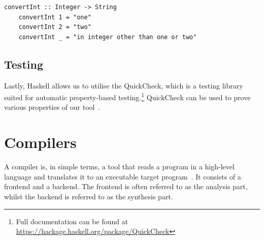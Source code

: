 \begin{lstlisting}[caption={A simple Haskell function converting values of type Integer to its string equivalent}, captionpos=b, frame=tlrb]
    convertInt :: Integer -> String
    convertInt 1 = "one"
    convertInt 2 = "two"
    convertInt _ = "in integer other than one or two"
\end{lstlisting}

\subsection{Testing}

Lastly, Haskell allows us to utilise the QuickCheck, which is a testing library suited for automatic property-based testing.\footnote{Full documentation can be found at \url{https://hackage.haskell.org/package/QuickCheck}} QuickCheck can be used to prove various properties of our tool~\cite{DBLP:conf/icfp/ClaessenH00}.

\section{Compilers}

A compiler is, in simple terms, a tool that reads a program in a high-level language and translates it to an executable target program~\cite{DBLP:books/aw/AhoSU86}. It consists of a frontend and a backend. The frontend is often referred to as the analysis part, whilst the backend is referred to as the synthesis part. \hfill \\

